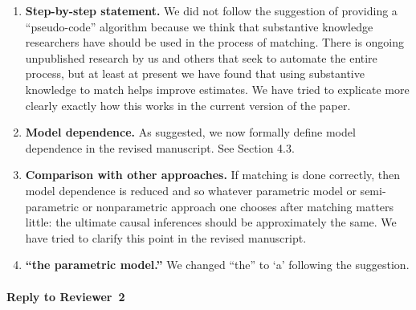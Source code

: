 \documentclass[11pt]{article}
\begin{document}
\begin{enumerate}
\item {\bf Step-by-step statement.} We did not follow the suggestion
  of providing a ``pseudo-code'' algorithm because we think that
  substantive knowledge researchers have should be used in the process
  of matching.  There is ongoing unpublished research by us and others
  that seek to automate the entire process, but at least at present we
  have found that using substantive knowledge to match helps improve
  estimates.  We have tried to explicate more clearly exactly how this
  works in the current version of the paper.
  
\item {\bf Model dependence.} As suggested, we now formally define
  model dependence in the revised manuscript. See Section 4.3.
  
\item {\bf Comparison with other approaches.} If matching is done
  correctly, then model dependence is reduced and so whatever
  parametric model or semi-parametric or nonparametric approach one
  chooses after matching matters little: the ultimate causal
  inferences should be approximately the same.  We have tried to
  clarify this point in the revised manuscript.


\item {\bf ``the parametric model.''} We changed ``the'' to `a'
  following the suggestion.
\end{enumerate}


\paragraph{Reply to Reviewer~2}
\end{document}
